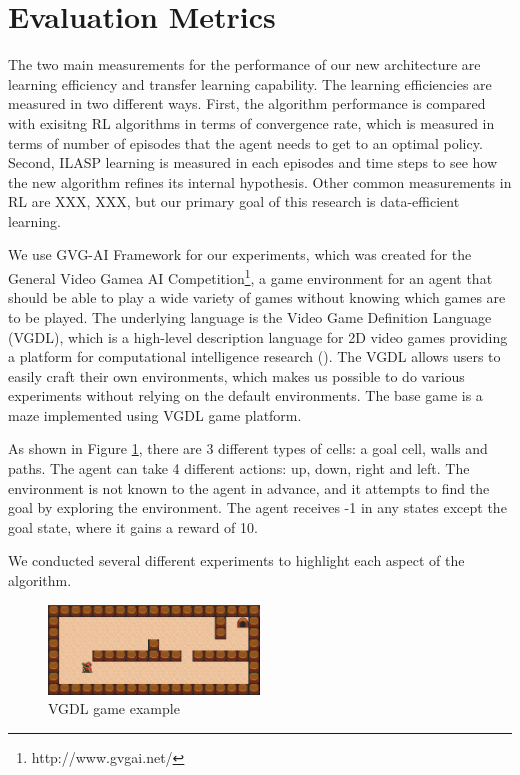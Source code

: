\section{Evaluation Metrics}
The two main measurements for the performance of our new architecture are learning efficiency and transfer learning capability.
The learning efficiencies are measured in two different ways. First, the algorithm performance is compared with exisitng RL algorithms in terms of 
convergence rate, which is measured in terms of number of episodes that the agent needs to get to an optimal policy.
Second, ILASP learning is measured in each episodes and time steps to see how the new algorithm refines its internal hypothesis. 
Other common measurements in RL are XXX, XXX, but our primary goal of this research is data-efficient learning.

We use GVG-AI Framework for our experiments, which was created for the General Video Gamea AI Competition\footnote{http://www.gvgai.net/}, 
a game environment for an agent that should be able to play a wide variety of games without knowing which games are to be played.
The underlying language is the Video Game Definition Language (VGDL), which is a high-level description language for 2D video games providing a platform for computational intelligence research (\cite{Schaul2013}).
The VGDL allows users to easily craft their own environments, which makes us possible to do various experiments without relying on the default environments.
The base game is a maze implemented using VGDL game platform. 

As shown in Figure \ref{VGDL_sample}, there are 3 different types of cells: 
a goal cell, walls and paths. The agent can take 4 different actions: up, down, right and left.  
The environment is not known to the agent in advance, and it attempts to find the goal by exploring the environment.
The agent receives -1 in any states except the goal state, where it gains a reward of 10. 

We conducted several different experiments to highlight each aspect of the algorithm.

\begin{figure}[!ht!b]
\centering
\includegraphics[width=0.5\textwidth]{./figures/experiment1}
\caption{VGDL game example}
\label{VGDL_sample}
\end{figure}
  
